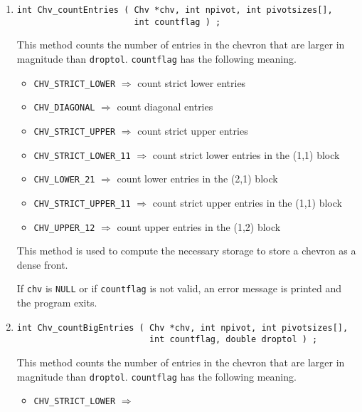 \begin{enumerate}
\item
\begin{verbatim}
int Chv_countEntries ( Chv *chv, int npivot, int pivotsizes[],
                       int countflag ) ;
\end{verbatim}
This method counts the number of entries in the chevron that are
larger in magnitude than {\tt droptol}.
{\tt countflag} has the following meaning.
\begin{itemize}
\item {\tt CHV\_STRICT\_LOWER} $\Longrightarrow$ 
      count strict lower entries
\item {\tt CHV\_DIAGONAL} $\Longrightarrow$ count diagonal entries
\item {\tt CHV\_STRICT\_UPPER} $\Longrightarrow$ 
      count strict upper entries
\item {\tt CHV\_STRICT\_LOWER\_11} $\Longrightarrow$ 
              count strict lower entries in the (1,1) block
\item {\tt CHV\_LOWER\_21} $\Longrightarrow$ 
              count lower entries in the (2,1) block
\item {\tt CHV\_STRICT\_UPPER\_11} $\Longrightarrow$ 
              count strict upper entries in the (1,1) block
\item {\tt CHV\_UPPER\_12} $\Longrightarrow$ 
              count upper entries in the (1,2) block
\end{itemize}
This method is used to compute the necessary storage to store a
chevron as a dense front.
\par {}
If {\tt chv} is {\tt NULL}
or if {\tt countflag} is not valid,
an error message is printed and the program exits.
\item
\begin{verbatim}
int Chv_countBigEntries ( Chv *chv, int npivot, int pivotsizes[],
                          int countflag, double droptol ) ;
\end{verbatim}
This method counts the number of entries in the chevron that are
larger in magnitude than {\tt droptol}.
{\tt countflag} has the following meaning.
\begin{itemize}
\item {\tt CHV\_STRICT\_LOWER} $\Longrightarrow$ 

\end{itemize}
\end{enumerate}
